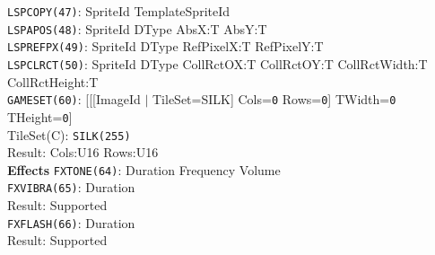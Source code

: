 \documentclass[a4paper,twocolumn,11pt]{article}
\begin{document}
\begin{flushleft}
\vskip 4pt
{\tt LSPCOPY(47)}: SpriteId TemplateSpriteId \\
\vskip 4pt
{\tt LSPAPOS(48)}: SpriteId DType AbsX:T AbsY:T \\
\vskip 4pt
{\tt LSPREFPX(49)}: SpriteId DType RefPixelX:T RefPixelY:T \\
\vskip 4pt
{\tt LSPCLRCT(50)}: SpriteId DType CollRctOX:T CollRctOY:T CollRctWidth:T CollRctHeight:T \\
\vskip 4pt
{\tt GAMESET(60)}: [[[ImageId $|$ TileSet=SILK] Cols={\tt 0} Rows={\tt 0}] TWidth={\tt 0} THeight={\tt 0}] \\
TileSet(C): {\tt SILK(255)} \\
Result: Cols:U16 Rows:U16 \\
\vskip 6pt
{\bf Effects}
\vskip 2pt
{\tt FXTONE(64)}: Duration Frequency Volume \\
\vskip 4pt
{\tt FXVIBRA(65)}: Duration \\
Result: Supported \\
\vskip 4pt
{\tt FXFLASH(66)}: Duration \\
Result: Supported \\
\vskip 4pt
\end{flushleft}
\end{document}
